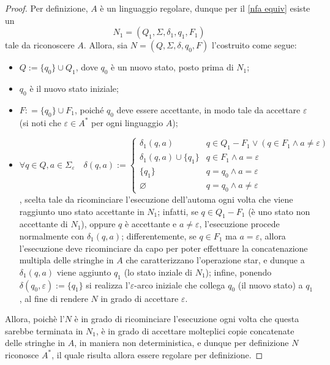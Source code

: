 \documentclass[a4paper, 12pt]{report}
\begin{document}
    \begin{proof}
        Per definizione, $A$ è un linguaggio regolare, dunque per il \cref{nfa equiv} esiste un \NFA $$N_1 = (Q_1, \Sigma, \delta_1, q_1, F_1)$$ tale da riconoscere $A$. Allora, sia $N = (Q, \Sigma, \delta, q_0, F)$ l'\NFA costruito come segue:

        \begin{itemize}
            \item $Q := \{q_0\} \cup Q_1$, dove $q_0$ è un nuovo stato, posto prima di $N_1$;
            \item $q_0$ è il nuovo stato iniziale;
            \item $F: = \{q_0\} \cup F_1$, poiché $q_0$ deve essere accettante, in modo tale da accettare $\varepsilon$ (si noti che $\varepsilon \in A^*$ per ogni linguaggio $A$);
            \item $\forall q \in Q, a \in \Sigma_\varepsilon \quad \delta(q, a) := \left \{ \begin{array}{ll} \delta_1(q, a) & q \in Q_1 - F_1 \lor (q \in F_1 \land a \neq \varepsilon) \\ \delta_1(q, a) \cup \{q_1\} & q \in F_1 \land a = \varepsilon \\ \{q_1\} & q = q_0 \land a = \varepsilon \\ \varnothing & q = q_0 \land a \neq \varepsilon \end{array} \right.$, scelta tale da ricominciare l'esecuzione dell'automa ogni volta che viene raggiunto uno stato accettante in $N_1$; infatti, se $q \in Q_1 - F_1$ (è uno stato non accettante di $N_1$), oppure $q$ è accettante e $a \neq \varepsilon$, l'esecuzione procede normalmente con $\delta_1(q, a)$; differentemente, se $q \in F_1$ ma $a = \varepsilon$, allora l'esecuzione deve ricominciare da capo per poter effettuare la concatenazione multipla delle stringhe in $A$ che caratterizzano l'operazione star, e dunque a $\delta_1(q, a)$ viene aggiunto $q_1$ (lo stato inziale di $N_1$); infine, ponendo $\delta(q_0, \varepsilon) := \{q_1\}$ si realizza l'$\varepsilon$-arco iniziale che collega $q_0$ (il nuovo stato) a $q_1$, al fine di rendere $N$ in grado di accettare $\varepsilon$.
        \end{itemize}

        
        Allora, poichè l'\NFA $N$ è in grado di ricominciare l'esecuzione ogni volta che questa sarebbe terminata in $N_1$, è in grado di accettare molteplici copie concatenate delle stringhe in $A$, in maniera non deterministica, e dunque per definizione $N$ riconosce $A^*$, il quale risulta allora essere regolare per definizione.
    \end{proof}
\end{document}

